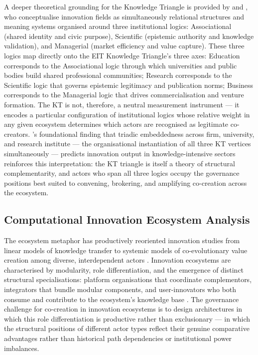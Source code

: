 \documentclass[review,12pt]{elsarticle}
\begin{document}
A deeper theoretical grounding for the Knowledge Triangle is provided by \citet{oberg2017culture} and \citet{korff2015interstitial}, who conceptualise innovation fields as simultaneously relational structures and meaning systems organised around three institutional logics: Associational (shared identity and civic purpose), Scientific (epistemic authority and knowledge validation), and Managerial (market efficiency and value capture). These three logics map directly onto the EIT Knowledge Triangle's three axes: Education corresponds to the Associational logic through which universities and public bodies build shared professional communities; Research corresponds to the Scientific logic that governs epistemic legitimacy and publication norms; Business corresponds to the Managerial logic that drives commercialisation and venture formation. The KT is not, therefore, a neutral measurement instrument --- it encodes a particular configuration of institutional logics whose relative weight in any given ecosystem determines which actors are recognised as legitimate co-creators. \citet{powell1996interorganizational}'s foundational finding that triadic embeddedness across firm, university, and research institute --- the organisational instantiation of all three KT vertices simultaneously --- predicts innovation output in knowledge-intensive sectors reinforces this interpretation: the KT triangle is itself a theory of structural complementarity, and actors who span all three logics occupy the governance positions best suited to convening, brokering, and amplifying co-creation across the ecosystem.

\subsection{Computational Innovation Ecosystem Analysis}

The ecosystem metaphor has productively reoriented innovation studies from linear models of knowledge transfer to systemic models of co-evolutionary value creation among diverse, interdependent actors \citep{jacobides2018towards}. Innovation ecosystems are characterised by modularity, role differentiation, and the emergence of distinct structural specialisations: platform organisations that coordinate complementors, integrators that bundle modular components, and user-innovators who both consume and contribute to the ecosystem's knowledge base \citep{fagerberg2005innovation}. The governance challenge for co-creation in innovation ecosystems is to design architectures in which this role differentiation is productive rather than exclusionary --- in which the structural positions of different actor types reflect their genuine comparative advantages rather than historical path dependencies or institutional power imbalances.
\end{document}
